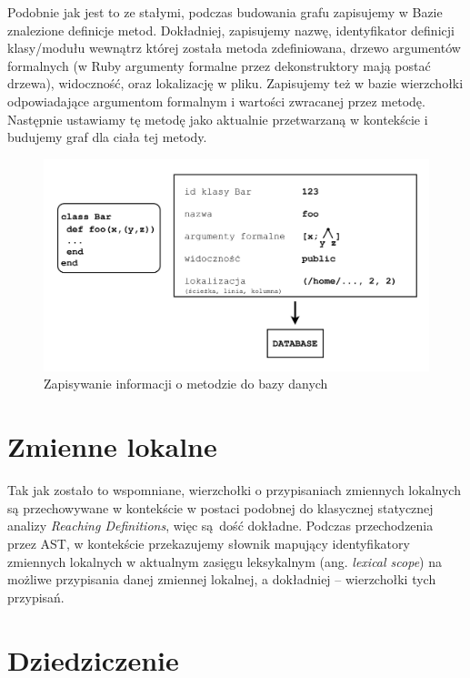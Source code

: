 \documentclass[shortabstract,mgr]{iithesis}
\begin{document}
Podobnie jak jest to ze stałymi, podczas budowania grafu zapisujemy w Bazie znalezione definicje metod. Dokładniej, zapisujemy nazwę, identyfikator definicji klasy/modułu wewnątrz której została metoda zdefiniowana, drzewo argumentów formalnych (w Ruby argumenty formalne przez dekonstruktory mają postać drzewa), widoczność, oraz lokalizację w pliku. Zapisujemy też w bazie wierzchołki odpowiadające argumentom formalnym i wartości zwracanej przez metodę. Następnie ustawiamy tę metodę jako aktualnie przetwarzaną w kontekście i budujemy graf dla ciała tej metody.


\begin{figure}[htb]
	\centering
	\includegraphics[scale=0.6]{imgs/method.png}
	\caption{Zapisywanie informacji o metodzie do bazy danych}
	\label{fig:build-method}
\end{figure}

\section{Zmienne lokalne}

Tak jak zostało to wspomniane, wierzchołki o przypisaniach zmiennych lokalnych są przechowywane w kontekście w postaci podobnej do klasycznej statycznej analizy \textit{Reaching Definitions}, więc są dość dokładne. Podczas przechodzenia przez AST, w kontekście przekazujemy słownik mapujący identyfikatory zmiennych lokalnych w aktualnym zasięgu leksykalnym (ang. \emph{lexical scope}) na możliwe przypisania danej zmiennej lokalnej, a dokładniej -- wierzchołki tych przypisań.



\section{Dziedziczenie}
\end{document}
